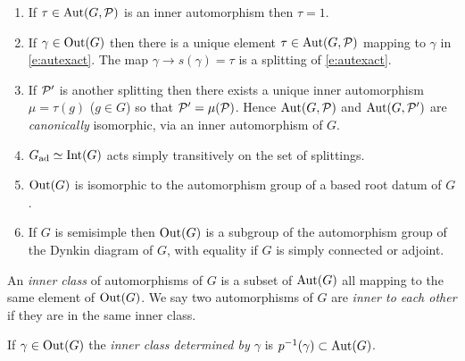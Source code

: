 \begin{theorem}
\begin{enumerate}


\item If $\tau\in \text{Aut}(G,\mathcal P)$ is an inner automorphism then $\tau=1$. 


\item If $\gamma\in\text{Out}(G)$ then there is a unique element $\tau\in\text{Aut}(G,\mathcal P)$ mapping to $\gamma$ in \eqref{e:autexact}.
The map $\gamma\rightarrow s(\gamma)=\tau$ is a splitting of \eqref{e:autexact}.

\item If $\mathcal P'$ is another splitting then there exists a unique inner automorphism $\mu=\tau(g)$ ($g\in G$) so that 
$\mathcal P'=\mu(\mathcal P)$. Hence $\text{Aut}(G,\mathcal P)$ and $\text{Aut}(G,\mathcal P')$ are {\it canonically} isomorphic, via an inner automorphism of $G$.

\item $G_{\text{ad}}\simeq \text{Int}(G)$ acts simply transitively on the set of splittings.

\item $\text{Out}(G)$ is isomorphic to the automorphism group of a based root datum of $G$. 

\item If $G$ is semisimple then $\text{Out}(G)$ is a subgroup of the automorphism group of the Dynkin diagram of $G$,
with equality if $G$ is simply connected or adjoint.
\end{enumerate}
\end{theorem}

\begin{definition}
An {\it inner class} of automorphisms of $G$ is a subset of
$\text{Aut}(G)$ all mapping to the same element of $\text{Out}(G)$.
We say two automorphisms of $G$ are {\it inner to each other} if they are in the same inner class.

If $\gamma\in \text{Out}(G)$ the {\it inner class determined by $\gamma$} is $p^{-1}(\gamma)\subset \text{Aut}(G)$. 
\end{definition}





